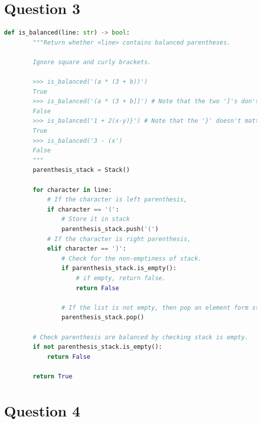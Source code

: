 \documentclass[12pt]{article}
\begin{document}
\section*{Question 3}
\begin{lstlisting}[language=Python,caption={worksheet\_9\_q3\_solution.py},captionpos=b]
    def is_balanced(line: str) -> bool:
        """Return whether <line> contains balanced parentheses.

        Ignore square and curly brackets.

        >>> is_balanced('(a * (3 + b))')
        True
        >>> is_balanced('(a * (3 + b]]') # Note that the two ']'s don't matter
        False
        >>> is_balanced('1 + 2(x-y)}') # Note that the '}' doesn't matter
        True
        >>> is_balanced('3 - (x')
        False
        """
        parenthesis_stack = Stack()

        for character in line:
            # If the character is left parenthesis,
            if character == '(':
                # Store it in stack
                parenthesis_stack.push('(')
            # If the character is right parenthesis,
            elif character == ')':
                # Check for the non-emptiness of stack.
                if parenthesis_stack.is_empty():
                    # if empty, return false.
                    return False

                # If the list is not empty, then pop an element form stack.
                parenthesis_stack.pop()

        # Check parenthesis are balanced by checking stack is empty.
        if not parenthesis_stack.is_empty():
            return False

        return True
\end{lstlisting}



\section*{Question 4}
\end{document}
